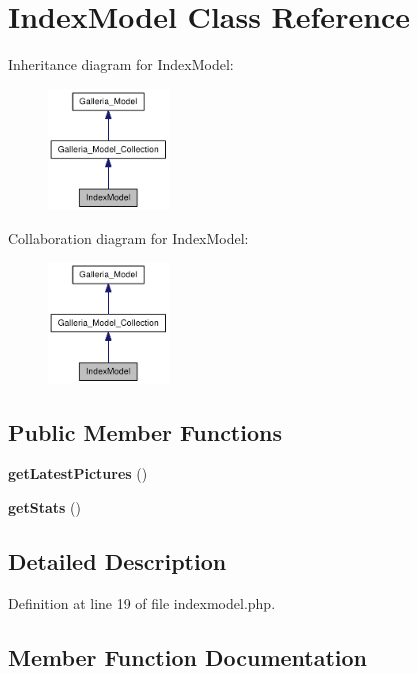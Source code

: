 \section{IndexModel Class Reference}
\label{classIndexModel}
Inheritance diagram for IndexModel:\nopagebreak
\begin{figure}[H]
\begin{center}
\leavevmode
\includegraphics[width=91pt]{classIndexModel__inherit__graph}
\end{center}
\end{figure}
Collaboration diagram for IndexModel:\nopagebreak
\begin{figure}[H]
\begin{center}
\leavevmode
\includegraphics[width=91pt]{classIndexModel__coll__graph}
\end{center}
\end{figure}
\subsection*{Public Member Functions}
\begin{CompactItemize}
\item 
{\bf getLatestPictures} ()
\item 
{\bf getStats} ()
\end{CompactItemize}


\subsection{Detailed Description}


Definition at line 19 of file indexmodel.php.

\subsection{Member Function Documentation}
